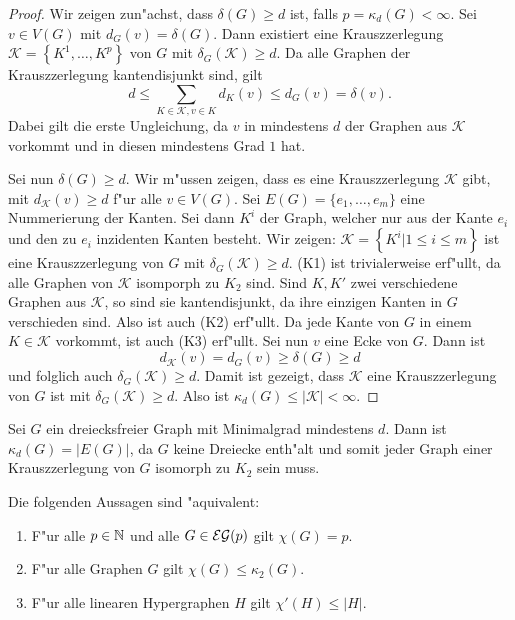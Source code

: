 \begin{proof}
  Wir zeigen zun"achst, dass $\delta(G) \geq d$ ist, falls $p = \kappa_d(G) < \infty$. Sei $v\in V(G)$ mit $d_{G}(v) = \delta(G)$. Dann existiert eine Krauszzerlegung $\mathcal{K}=\left\{ K^{1}, \dots , K^{p} \right\}$ von $G$ mit $\delta_{G}(\mathcal{K}) \geq d$. Da alle Graphen der Krauszzerlegung kantendisjunkt sind, gilt $$ d \leq \sum\limits_{K\in \mathcal{K}, v\in K} d_{K}(v) \leq d_{G}(v) = \delta(v).$$
  Dabei gilt die erste Ungleichung, da $v$ in mindestens $d$ der Graphen aus $\mathcal{K}$ vorkommt und in diesen mindestens Grad $1$ hat.

  Sei nun $\delta(G) \geq d$. Wir m"ussen zeigen, dass es eine Krauszzerlegung $\mathcal{K}$ gibt, mit
  $d_{\mathcal{K}}(v) \geq d$ f"ur alle $v\in V(G)$. Sei $E(G)= \{e_1,\dots, e_{m}\}$ eine Nummerierung der Kanten. Sei dann $K^i$ der Graph, welcher nur aus der Kante $e_i$ und den zu $e_i$ inzidenten Kanten besteht. Wir zeigen: $\mathcal{K} = \left\{ K^i | 1 \leq i \leq m \right\}$ ist eine Krauszzerlegung von $G$ mit $\delta_{G}(\mathcal{K}) \geq d$. (K1) ist trivialerweise erf"ullt, da alle Graphen von $\mathcal{K}$ isomporph zu $K_{2}$ sind. Sind $K,K'$ zwei verschiedene Graphen aus $\mathcal{K}$, so sind sie
  kantendisjunkt, da ihre einzigen Kanten in $G$ verschieden sind. Also ist auch (K2) erf"ullt. Da jede Kante von $G$ in einem $K\in \mathcal{K}$ vorkommt, ist auch (K3) erf"ullt. Sei nun $v$ eine Ecke von $G$. Dann ist $$d_{\mathcal{K}}(v) = d_{G}(v) \geq \delta(G) \geq d$$ und folglich auch $\delta_{G}(\mathcal{K}) \geq d$. Damit ist gezeigt, dass $\mathcal{K}$ eine Krauszzerlegung von $G$ ist mit $\delta_{G}\left( \mathcal{K} \right) \geq d$. Also ist
  $\kappa_{d}(G) \leq |\mathcal{K}| <
  \infty$.
\end{proof}

\begin{example}
  Sei $G$ ein dreiecksfreier Graph mit Minimalgrad mindestens $d$. Dann ist $\kappa_{d}(G) = |E(G)|$, da $G$ keine Dreiecke enth"alt und somit jeder Graph einer Krauszzerlegung von $G$ isomorph zu $K_{2}$ sein muss. 
\end{example}

\begin{theorem}
  Die folgenden Aussagen sind "aquivalent:
  \begin{enumerate}[label=\rm{(\alph*)}]
    \item F"ur alle $p\in{\mathbb{N}}$ und alle $G\in{\cal EG}(p)$ gilt $\chi(G) = p$.
    \item F"ur alle Graphen $G$ gilt $\chi(G) \leq \kappa_{2}(G)$.
    \item F"ur alle linearen Hypergraphen $H$ gilt $\chi'(H) \leq |H|$.
  \end{enumerate}
  \label{thm:equivefl}
\end{theorem}

